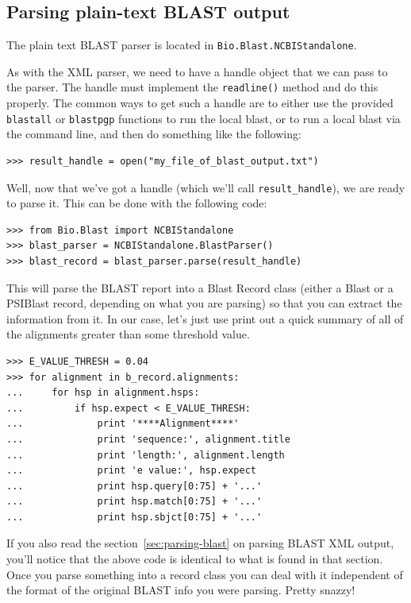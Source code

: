 \documentclass{report}
\begin{document}
\subsection{Parsing plain-text BLAST output}

The plain text BLAST parser is located in \verb|Bio.Blast.NCBIStandalone|.

As with the XML parser, we need to have a handle object that we can pass to the parser. The handle must implement the \verb|readline()| method and do this properly. The common ways to get such a handle are to either use the provided \verb|blastall| or \verb|blastpgp| functions to run the local blast, or to run a local blast via the command line, and then do something like the following:

\begin{verbatim}
>>> result_handle = open("my_file_of_blast_output.txt")
\end{verbatim}

Well, now that we've got a handle (which we'll call \verb|result_handle|),
we are ready to parse it. This can be done with the following code:

\begin{verbatim}
>>> from Bio.Blast import NCBIStandalone
>>> blast_parser = NCBIStandalone.BlastParser()
>>> blast_record = blast_parser.parse(result_handle)
\end{verbatim}

This will parse the BLAST report into a Blast Record class (either a Blast or a PSIBlast record, depending on what you are parsing) so that you can extract the information from it. In our case, let's just use print out a quick summary of all of the alignments greater than some threshold value.

\begin{verbatim}
>>> E_VALUE_THRESH = 0.04
>>> for alignment in b_record.alignments:
...     for hsp in alignment.hsps:
...         if hsp.expect < E_VALUE_THRESH:
...             print '****Alignment****'
...             print 'sequence:', alignment.title
...             print 'length:', alignment.length
...             print 'e value:', hsp.expect
...             print hsp.query[0:75] + '...'
...             print hsp.match[0:75] + '...'
...             print hsp.sbjct[0:75] + '...'
\end{verbatim}

If you also read the section~\ref{sec:parsing-blast} on parsing BLAST XML output, you'll notice that the above code is identical to what is found in that section. Once you parse something into a record class you can deal with it independent of the format of the original BLAST info you were parsing. Pretty snazzy!
\end{document}

